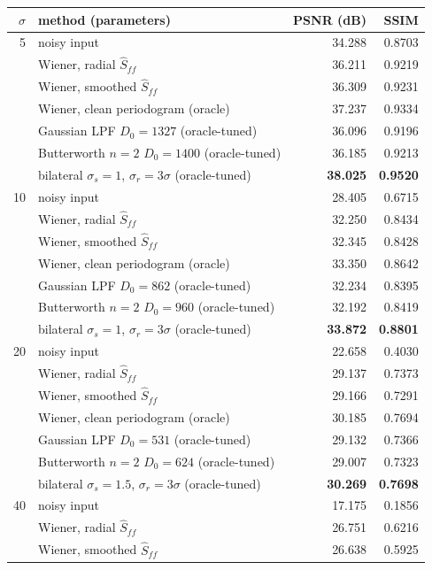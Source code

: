 \begin{table}[H]
\centering
\small
\begin{tabular}{rlrr}
\toprule
$\sigma$ & method (parameters) & PSNR (dB) & SSIM\\
\midrule
5 & noisy input & 34.288 & 0.8703\\
 & Wiener, radial $\hat S_{ff}$ & 36.211 & 0.9219\\
 & Wiener, smoothed $\hat S_{ff}$ & 36.309 & 0.9231\\
 & Wiener, clean periodogram (oracle) & 37.237 & 0.9334\\
 & Gaussian LPF $D_0=1327$ (oracle-tuned) & 36.096 & 0.9196\\
 & Butterworth $n=2$ $D_0=1400$ (oracle-tuned) & 36.185 & 0.9213\\
 & bilateral $\sigma_s=1$, $\sigma_r=3\sigma$ (oracle-tuned) & \textbf{38.025} & \textbf{0.9520}\\
\midrule
10 & noisy input & 28.405 & 0.6715\\
 & Wiener, radial $\hat S_{ff}$ & 32.250 & 0.8434\\
 & Wiener, smoothed $\hat S_{ff}$ & 32.345 & 0.8428\\
 & Wiener, clean periodogram (oracle) & 33.350 & 0.8642\\
 & Gaussian LPF $D_0=862$ (oracle-tuned) & 32.234 & 0.8395\\
 & Butterworth $n=2$ $D_0=960$ (oracle-tuned) & 32.192 & 0.8419\\
 & bilateral $\sigma_s=1$, $\sigma_r=3\sigma$ (oracle-tuned) & \textbf{33.872} & \textbf{0.8801}\\
\midrule
20 & noisy input & 22.658 & 0.4030\\
 & Wiener, radial $\hat S_{ff}$ & 29.137 & 0.7373\\
 & Wiener, smoothed $\hat S_{ff}$ & 29.166 & 0.7291\\
 & Wiener, clean periodogram (oracle) & 30.185 & 0.7694\\
 & Gaussian LPF $D_0=531$ (oracle-tuned) & 29.132 & 0.7366\\
 & Butterworth $n=2$ $D_0=624$ (oracle-tuned) & 29.007 & 0.7323\\
 & bilateral $\sigma_s=1.5$, $\sigma_r=3\sigma$ (oracle-tuned) & \textbf{30.269} & \textbf{0.7698}\\
\midrule
40 & noisy input & 17.175 & 0.1856\\
 & Wiener, radial $\hat S_{ff}$ & 26.751 & 0.6216\\
 & Wiener, smoothed $\hat S_{ff}$ & 26.638 & 0.5925\\

\end{tabular}
\end{table}
